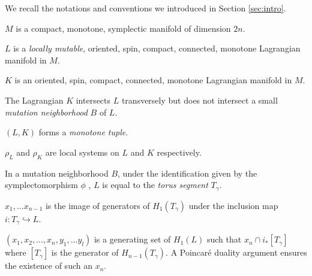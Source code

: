 We recall  the notations and conventions we introduced in Section \ref{sec:intro}.
\begin{listC}
    \item $M$ is a compact, monotone, symplectic manifold of dimension $2n$.
    \item $L$ is a \textit{locally mutable},  oriented,  spin, compact, connected, monotone Lagrangian manifold in $M$. 
    \item $K$ is an oriented,  spin, compact, connected,  monotone Lagrangian manifold in $M$. 
    \item The Lagrangian $K$ intersects $L$ transversely but does not intersect a small \textit{mutation neighborhood} $B$ of $L$. 
    \item  $(L, K)$ forms a \textit{monotone tuple}. 
    \item $\rho_L$ and $\rho_K$ are local systems on $L$ and $K$ respectively.
    \item In a mutation neighborhood $B$,  under the identification given by the symplectomorphism $\phi$ ,  $L$ is equal to the \textit{torus segment} $T_\gamma$. 
    \item $x_1, \dots x_{n-1}$ is the image of generators of $H_1(T_\gamma)$ under the inclusion map $i:T_\gamma \hookrightarrow L$.  
    \item $(x_1, x_2, \dots, x_n,  y_1, \dots y_l)$ is a generating set of $H_1(L)$ such that $x_n \cap i_*[T_\gamma]$ where $[T_\gamma]$ is the generator of $H_{n-1}(T_\gamma)$. A Poincar\'{e} duality argument ensures the existence of such an $x_n$.
\end{listC}


